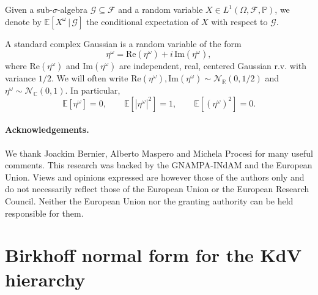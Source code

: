 \documentclass[a4paper,10pt,reqno]{article}
\theoremstyle{definition}
\theoremstyle{plain}
\theoremstyle{plain}
\theoremstyle{definition}
\theoremstyle{plain}
\theoremstyle{plain}
\theoremstyle{plain}
\theoremstyle{definition}
\theoremstyle{definition}
\def \Z{\mathbb Z}
\def \R{\mathbb R}
\def \C{\mathbb C}
\def \P{{\mathbb P}}
\def \E{\mathbb{E}}
\begin{document}
Given a sub-$\sigma$-algebra $\mathcal{G} \subseteq \mathcal{F}$ and a random variable $X\in L^1(\mathbb{\Omega},\mathcal{F}, \P)$, we denote by $\E[X^{\omega}\, \lvert \, \mathcal{G}]$ the conditional expectation of $X$ with respect to $\mathcal{G}$.

A standard complex Gaussian is a random variable of the form 
\begin{equation} \label{intro: complex gaussian}
\eta^{\omega} = \mathrm{Re}(\eta^{\omega}) + i \, \mathrm{Im}(\eta^{\omega}), 
\end{equation}
where $\mathrm{Re}(\eta^{\omega})$ and $\mathrm{Im}(\eta^{\omega})$ are independent, real, centered Gaussian r.v. with variance $1/2$. We will often write $\mathrm{Re}(\eta^{\omega}),\mathrm{Im}(\eta^{\omega})\sim \mathcal{N}_{\R}(0,1/2)$
and $\eta^{\omega}\sim \mathcal{N}_{\C}(0,1)$. In particular,
\begin{equation} \label{intro: valori attesi}
\E [\eta^{\omega}] = 0, \qquad \E \left [ |\eta^{\omega}|^2 \right ] = 1, \qquad \E[(\eta^{\omega})^2] = 0.
\end{equation}



\paragraph{Acknowledgements.} We thank Joackim Bernier, Alberto Maspero and Michela Procesi for many useful comments. This research was backed by the GNAMPA-INdAM and the European Union. Views and opinions expressed are however those of the authors only and do not necessarily reflect those of the European Union or the European Research Council. Neither the European Union nor the granting authority can be held responsible for them.

\section{Birkhoff normal form for the KdV hierarchy} \label{section: normal form}
\end{document}
